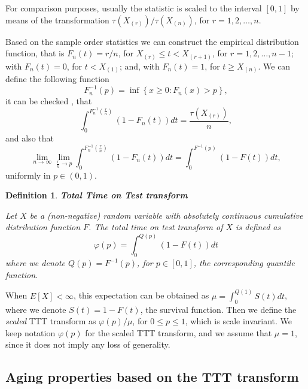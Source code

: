\documentclass[preprint,12pt]{elsarticle}
\newtheorem{dfn}{{\sc Definition}}[section]
\begin{document}
For comparison purposes, usually the statistic is scaled to the interval $[0,1]$ by means of the transformation $\tau\left(X_{(r)}\right)/\tau\left(X_{(n)}\right)$, for $r=1,2,\ldots,n$.

Based on the sample order statistics we can construct the empirical distribution function, that is $F_n(t)=r/n$, for $X_{(r)} \leq t < X_{(r+1)}$, for $r=1,2,\ldots,n-1$; with $F_n(t)=0$, for $t <X_{(1)}$; and, with $F_n(t)=1$, for $t \geq X_{(n)}$. We can define the following function
\[
F^{-1}_n(p)= \inf \left\{x \geq 0:F_n(x) >p\right\},
\]
it can be checked \cite{Nair2013}, that
\[
\displaystyle{\int_0^{F^{-1}_n(\frac{r}{n})}} \left(1-F_n(t)\right)dt= \frac{\tau(X_{(r)})}{n},
\]
and also that
\[
\underset{n\rightarrow \infty}{\lim}\underset{\frac{r}{n}\rightarrow p}{\lim}\displaystyle{\int_0^{F^{-1}_n\left(\frac{r}{n}\right)}}\left(1-F_n(t)\right) dt= \displaystyle{\int_0^{F^{-1}(p)}}\left(1-F(t)\right) dt,
\]
uniformly in $p\in (0,1)$. 

\begin{dfn}\textbf{Total Time on Test transform} \label{ttt.def2} 

\noindent Let $X$ be a (non-negative) random variable with absolutely continuous cumulative distribution function $F$. The \textit{total time on test transform} of $X$ is defined as
\begin{equation} \label{ttt.curve}
\varphi(p) =\displaystyle{\int_0^{Q(p)}}\left(1-F(t)\right) dt
\end{equation}
where we denote $Q(p)= F^{-1}(p)$, for $p\in [0,1]$, the corresponding quantile function.
\end{dfn}
When $E[X] < \infty$, this expectation can be obtained as $\mu=\int_0^{Q(1)} S(t)dt$, where we denote $S(t)=1-F(t)$, the survival function. Then we define the {\textit{scaled}} TTT transform as $\varphi(p)/\mu$, for $0 \leq p \leq 1$,  which is scale invariant. We keep notation $\varphi(p)$ for the scaled TTT transform, and we assume that $\mu=1$, since it does not imply any loss of generality.


\subsection{Aging properties based on the TTT transform}\label{sec:aging}
\end{document}
